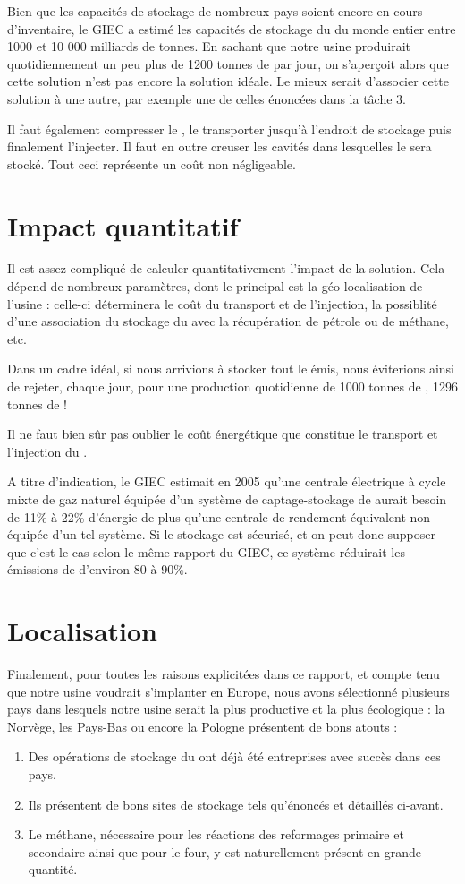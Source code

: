 \documentclass[a4, oneside, headings=normal]{scrartcl}
\begin{document}
Bien que les capacités de stockage de nombreux pays soient encore en cours d'inventaire, le GIEC a estimé les capacités de stockage du  du monde entier entre 1000 et 10 000 milliards de tonnes. En sachant que notre usine produirait quotidiennement un peu plus de 1200 tonnes de  par jour, on s'aperçoit alors que cette solution n'est pas encore la solution idéale. Le mieux serait d'associer cette solution à une autre, par exemple une de celles énoncées dans la tâche 3.
 

Il faut également compresser le , le transporter jusqu'à l'endroit de stockage puis finalement l'injecter. Il faut en outre creuser les cavités dans lesquelles le  sera stocké. Tout ceci représente un coût non négligeable.

\section{Impact quantitatif}
Il est assez compliqué de calculer quantitativement l'impact de la solution. Cela dépend de nombreux paramètres, dont le principal est la géo-localisation de l'usine : celle-ci déterminera le coût du transport et de l'injection, la possiblité d'une association du stockage du  avec la récupération de pétrole ou de méthane, etc.
 

Dans un cadre idéal, si nous arrivions à stocker tout le  émis, nous éviterions ainsi de rejeter, chaque jour, pour une production quotidienne de 1000 tonnes de , 1296 tonnes de  !


Il ne faut bien sûr pas oublier le coût énergétique que constitue le transport et l'injection du .
 

A titre d'indication, le GIEC estimait en 2005 qu'une centrale électrique à cycle mixte de gaz naturel équipée d'un système de captage-stockage de  aurait besoin de 11\% à 22\% d'énergie de plus qu'une centrale de rendement équivalent non équipée d'un tel système. Si le stockage est sécurisé, et on peut donc supposer que c'est le cas selon le même rapport du GIEC, ce système réduirait les émissions de  d'environ 80 à 90\%.


\section{Localisation}
Finalement, pour toutes les raisons explicitées dans ce rapport, et compte tenu que notre usine voudrait s'implanter en Europe, nous avons sélectionné plusieurs pays dans lesquels notre usine serait la plus productive et la plus écologique : la Norvège, les Pays-Bas ou encore la Pologne présentent de bons atouts :
\begin{enumerate}
\item Des opérations de stockage du  ont déjà été entreprises avec succès dans ces pays.
\item Ils présentent de bons sites de stockage tels qu'énoncés et détaillés ci-avant.
\item Le méthane, nécessaire pour les réactions des reformages primaire et secondaire ainsi que pour le four, y est naturellement présent en grande quantité.
\end{enumerate}

\printbibliography[heading=bibintoc]
\end{document}
